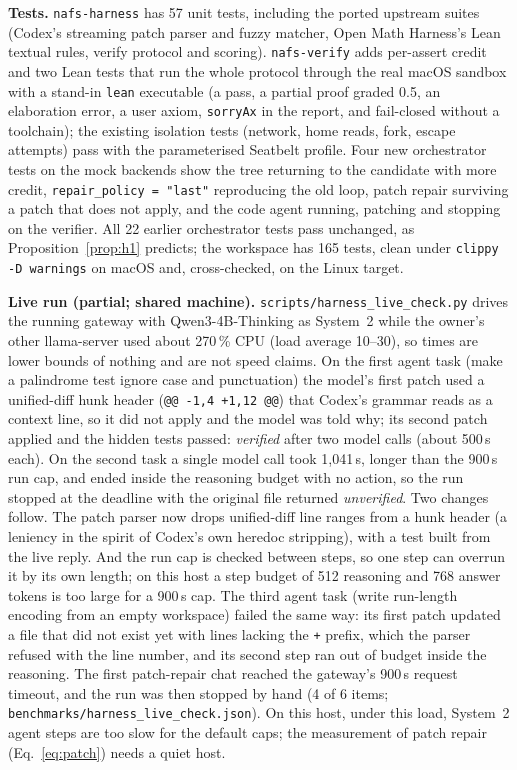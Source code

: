 \textbf{Tests.} \texttt{nafs-harness} has 57 unit tests, including the ported
upstream suites (Codex's streaming patch parser and fuzzy matcher, Open Math
Harness's Lean textual rules, verify protocol and scoring). \texttt{nafs-verify}
adds per-assert credit and two Lean tests that run the whole protocol through the
real macOS sandbox with a stand-in \texttt{lean} executable (a pass, a partial
proof graded 0.5, an elaboration error, a user axiom, \texttt{sorryAx} in the
report, and fail-closed without a toolchain); the existing isolation tests
(network, home reads, fork, escape attempts) pass with the parameterised
Seatbelt profile. Four new orchestrator tests on the mock backends show the tree
returning to the candidate with more credit, \texttt{repair\_policy = "last"}
reproducing the old loop, patch repair surviving a patch that does not apply, and
the code agent running, patching and stopping on the verifier. All 22 earlier
orchestrator tests pass unchanged, as Proposition~\ref{prop:h1} predicts; the
workspace has 165 tests, clean under \texttt{clippy -D warnings} on macOS and,
cross-checked, on the Linux target.

\textbf{Live run (partial; shared machine).} \texttt{scripts/harness\_live\_check.py}
drives the running gateway with Qwen3-4B-Thinking as System~2 while the owner's
other llama-server used about 270\,\% CPU (load average 10--30), so times are
lower bounds of nothing and are not speed claims. On the first agent task (make a
palindrome test ignore case and punctuation) the model's first patch used a
unified-diff hunk header (\texttt{@@ -1,4 +1,12 @@}) that Codex's grammar reads as
a context line, so it did not apply and the model was told why; its second patch
applied and the hidden tests passed: \emph{verified} after two model calls
(about 500\,s each). On the second task a single model call took 1{,}041\,s,
longer than the 900\,s run cap, and ended inside the reasoning budget with no
action, so the run stopped at the deadline with the original file returned
\emph{unverified}. Two changes follow. The patch parser now drops unified-diff line
ranges from a hunk header (a leniency in the spirit of Codex's own heredoc
stripping), with a test built from the live reply. And the run cap is checked
between steps, so one step can overrun it by its own length; on this host a step
budget of 512 reasoning and 768 answer tokens is too large for a 900\,s cap. The third agent task (write run-length encoding from an empty workspace) failed
the same way: its first patch updated a file that did not exist yet with lines
lacking the \texttt{+} prefix, which the parser refused with the line number, and
its second step ran out of budget inside the reasoning. The first patch-repair chat
reached the gateway's 900\,s request timeout, and the run was then stopped by
hand (4 of 6 items; \texttt{benchmarks/harness\_live\_check.json}). On this host,
under this load, System~2 agent steps are too slow for the default caps; the
measurement of patch repair (Eq.~\ref{eq:patch}) needs a quiet host.
